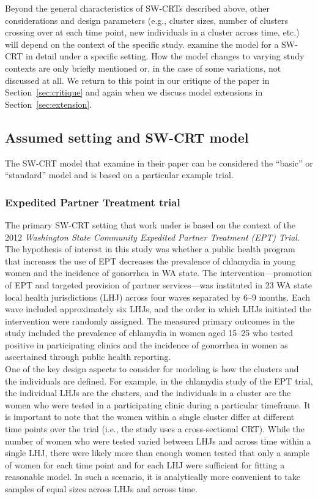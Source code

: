\documentclass[10pt]{article}
\begin{document}
Beyond the general characteristics of SW-CRTs described above, other considerations and design parameters (e.g., cluster sizes, number of clusters crossing over at each time point, new individuals in a cluster across time, etc.) will depend on the context of the specific study. \citeauthor{Hussey:2007} examine the model for a SW-CRT in detail under a specific setting. How the model changes to varying study contexts are only briefly mentioned or, in the case of some variations, not discussed at all. We return to this point in our critique of the paper in Section~\ref{sec:critique} and again when we discuss model extensions in Section~\ref{sec:extension}.

\subsection{Assumed setting and SW-CRT model}

The SW-CRT model that \textcite{Hussey:2007} examine in their paper can be considered the ``basic'' or ``standard'' model and is based on a particular example trial.

\subsubsection{Expedited Partner Treatment trial}

The primary SW-CRT setting that \citeauthor{Hussey:2007} work under is based on the context of the 2012 \textit{Washington State Community Expedited Partner Treatment (EPT) Trial}. The hypothesis of interest in this study was whether a public health program that increases the use of EPT decreases the prevalence of chlamydia in young women and the incidence of gonorrhea in WA state. The intervention---promotion of EPT and targeted provision of partner services---was instituted in 23 WA state local health jurisdictions (LHJ) across four waves separated by 6--9 months. Each wave included approximately six LHJs, and the order in which LHJs initiated the intervention were randomly assigned. The measured primary outcomes in the study included the prevalence of chlamydia in women aged 15--25 who tested positive in participating clinics and the incidence of gonorrhea in women as ascertained through public health reporting.
\\

One of the key design aspects to consider for modeling is how the clusters and the individuals are defined. For example, in the chlamydia study of the EPT trial, the individual LHJs are the clusters, and the individuals in a cluster are the women who were tested in a participating clinic during a particular timeframe. It is important to note that the women within a single cluster differ at different time points over the trial (i.e., the study uses a cross-sectional CRT). While the number of women who were tested varied between LHJs and across time within a single LHJ, there were likely more than enough women tested that only a sample of women for each time point and for each LHJ were sufficient for fitting a reasonable model. In such a scenario, it is analytically more convenient to take samples of equal sizes across LHJs and across time.
\\
\end{document}
